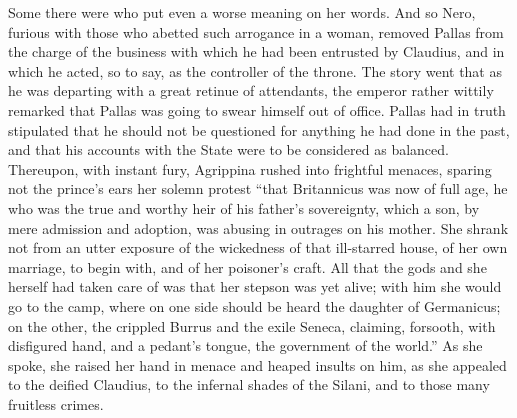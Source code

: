 Some there were who put even a worse meaning on her words. And so Nero, furious with those who abetted such arrogance in a woman, removed Pallas from the charge of the business with which he had been entrusted by Claudius, and in which he acted, so to say, as the controller of the throne. The story went that as he was departing with a great retinue of attendants, the emperor rather wittily remarked that Pallas was going to swear himself out of office. Pallas had in truth stipulated that he should not be questioned for anything he had done in the past, and that his accounts with the State were to be considered as balanced. Thereupon, with instant fury, Agrippina rushed into frightful menaces, sparing not the prince's ears her solemn protest ``that Britannicus was now of full age, he who was the true and worthy heir of his father's sovereignty, which a son, by mere admission and adoption, was abusing in outrages on his mother. She shrank not from an utter exposure of the wickedness of that ill-starred house, of her own marriage, to begin with, and of her poisoner's craft. All that the gods and she herself had taken care of was that her stepson was yet alive; with him she would go to the camp, where on one side should be heard the daughter of Germanicus; on the other, the crippled Burrus and the exile Seneca, claiming, forsooth, with disfigured hand, and a pedant's tongue, the government of the world.'' As she spoke, she raised her hand in menace and heaped insults on him, as she appealed to the deified Claudius, to the infernal shades of the Silani, and to those many fruitless crimes.


